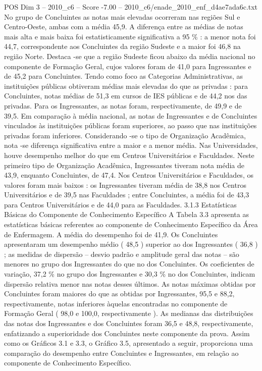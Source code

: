 \begin{textsample}{POS Dim 3 – 2010\_c6 – Score -7.00 – 2010\_c6/enade\_2010\_enf\_d4ae7ada6c.txt}
No grupo de Concluintes as notas mais elevadas ocorreram nas regiões Sul e Centro-Oeste, ambas com a média 45,9.
A diferença entre as médias de notas mais alta e mais baixa foi estatisticamente significativa a 95 \% : a menor nota foi 44,7, correspondente aos Concluintes da região Sudeste e a maior foi 46,8 na região Norte.
Destaca -se que a região Sudeste ficou abaixo da média nacional no componente de Formação Geral, cujos valores foram de 41,0 para Ingressantes e de 45,2 para Concluintes.
Tendo como foco as Categorias Administrativas, as instituições públicas obtiveram médias mais elevadas do que as privadas : para Concluintes, notas médias de 51,3 em cursos de IES públicas e de 44,2 nos das privadas.
Para os Ingressantes, as notas foram, respectivamente, de 49,9 e de 39,5.
Em comparação à média nacional, as notas de Ingressantes e de Concluintes vinculados às instituições públicas foram superiores, ao passo que nas instituições privadas foram inferiores.
Considerando -se o tipo de Organização Acadêmica, nota -se diferença significativa entre a maior e a menor média.
Nas Universidades, houve desempenho melhor do que em Centros Universitários e Faculdades.
Neste primeiro tipo de Organização Acadêmica, Ingressantes tiveram nota média de 43,9, enquanto Concluintes, de 47,4.
Nos Centros Universitários e Faculdades, os valores foram mais baixos : os Ingressantes tiveram média de 38,8 nos Centros Universitários e de 39,5 nas Faculdades ; entre Concluintes, a média foi de 43,3 para Centros Universitários e de 44,0 para as Faculdades. 3.1.3 Estatísticas Básicas do Componente de Conhecimento Específico A Tabela 3.3 apresenta as estatísticas básicas referentes ao componente de Conhecimento Específico da Área de Enfermagem.
A média do desempenho foi de 41,9.
Os Concluintes apresentaram um desempenho médio ( 48,5 ) superior ao dos Ingressantes ( 36,8 ) ; as medidas de dispersão – desvio padrão e amplitude geral das notas – são menores no grupo dos Ingressantes do que no dos Concluintes.
Os coeficientes de variação, 37,2 \% no grupo dos Ingressantes e 30,3 \% no dos Concluintes, indicam dispersão relativa menor nas notas desses últimos.
As notas máximas obtidas por Concluintes foram maiores do que as obtidas por Ingressantes, 95,5 e 88,2, respectivamente, notas inferiores àquelas encontradas no componente de Formação Geral ( 98,0 e 100,0, respectivamente ).
As medianas das distribuições das notas dos Ingressantes e dos Concluintes foram 36,5 e 48,8, respectivamente, enfatizando a superioridade dos Concluintes neste componente da prova.
Assim como os Gráficos 3.1 e 3.3, o Gráfico 3.5, apresentado a seguir, proporciona uma comparação do desempenho entre Concluintes e Ingressantes, em relação ao componente de Conhecimento Específico.

\end{textsample}
